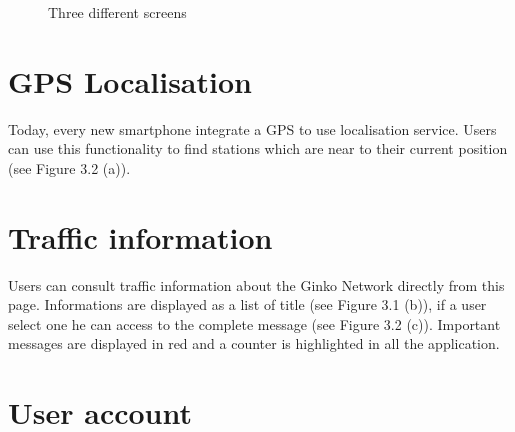 \documentclass[a4paper, 12pt]{report}
\begin{document}
\begin{figure}[htp]

  \caption{Three different screens}
\end{figure}

\section{GPS Localisation}

Today, every new smartphone integrate a GPS to use localisation service. Users can use this functionality to find stations which are near to their current position (see Figure 3.2 (a)).


\section{Traffic information}

Users can consult traffic information about the Ginko Network directly from this page. Informations are displayed as a list of title (see Figure 3.1 (b)), if a user select one he can access to the complete message  (see Figure 3.2 (c)). Important messages are displayed in red and a counter is highlighted in all the application.


\section{User account}
\end{document}
